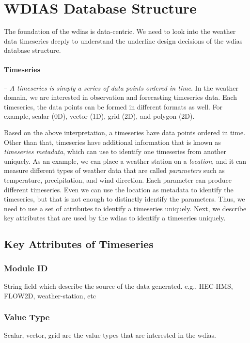 \section{WDIAS Database Structure}
\label{se:db_struct}

The foundation of the \acrshort{wdias} is data-centric. We need to look into the weather data timeseries deeply to understand the underline design decisions of the \acrshort{wdias} database structure.

\paragraph{Timeseries}-- \emph{A timeseries is simply a series of data points ordered in time}. In the weather domain, we are interested in observation and forecasting timeseries data. Each timeseries, the data points can be formed in different formats as well. For example, scalar (0D), vector (1D), grid (2D), and polygon (2D).

Based on the above interpretation, a timeseries have data points ordered in time. Other than that, timeseries have additional information that is known as \emph{timeseries metadata}, which can use to identify one timeseries from another uniquely. As an example, we can place a weather station on a \emph{location}, and it can measure different types of weather data that are called \emph{parameters} such as temperature, precipitation, and wind direction. Each parameter can produce different timeseries. Even we can use the location as metadata to identify the timeseries, but that is not enough to distinctly identify the parameters. Thus, we need to use a set of attributes to identify a timeseries uniquely. Next, we describe key attributes that are used by the \acrshort{wdias} to identify a timeseries uniquely.


\subsection{Key Attributes of Timeseries}
\label{subse:timeseries_key_attributes}

\subsubsection{Module ID}
String field which describe the source of the data generated. e.g., HEC-HMS, FLOW2D, weather-station, etc

\subsubsection{Value Type}
Scalar, vector, grid are the value types that are interested in the \acrshort{wdias}.

